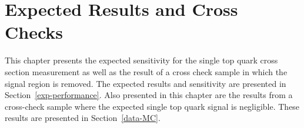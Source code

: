 \chapter{Expected Results and Cross Checks}
\label{expectedresults}

This chapter presents the expected sensitivity for the single top quark cross section measurement as well as the result of a cross check sample in which the signal region is removed. The expected results and sensitivity are presented in Section~\ref{exp-performance}. Also presented in this chapter are the results from a cross-check sample where the expected single top quark signal is negligible. These results are presented in Section~\ref{data-MC}.

